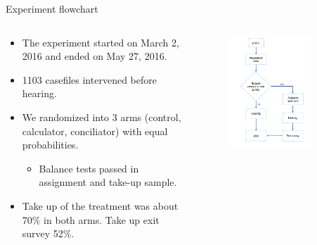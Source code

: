 \documentclass[9pt]{beamer}
\begin{document}
\begin{frame}{Experiment flowchart}
\begin{columns}[T]
    \begin{column}{.6\textwidth}
    \begin{itemize}
        \vspace{.2in}
        \item The experiment started on March 2, 2016 and ended on May 27, 2016.
        \item 1103 casefiles intervened before hearing.
        \vspace{0.1in}
        \item We randomized into 3 arms (control, calculator, conciliator) with equal probabilities. 
            \begin{itemize}
                \item Balance tests passed in assignment and take-up sample.
            \end{itemize}
        \vspace{0.1in}    
        \item Take up of the treatment was about 70\% in both arms. Take up exit survey 52\%.
       \end{itemize} 
    \end{column}
    \begin{column}{.5\textwidth}
    \begin{figure}[H]
   \label{treatment_flowchart}
    \includegraphics[width=0.8\textwidth]{./Figuras/Experiment_flowchart.png}
\end{figure}
\end{column}
  \end{columns}
\end{frame}
\end{document}
